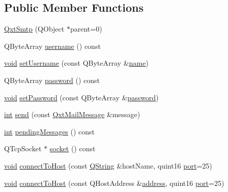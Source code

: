 \subsection*{Public Member Functions}
\begin{DoxyCompactItemize}
\item 
\hyperlink{class_qxt_smtp_a47e3f8f15544208303c1b2a85c2df804}{Qxt\-Smtp} (Q\-Object $\ast$parent=0)
\item 
Q\-Byte\-Array \hyperlink{class_qxt_smtp_a5bdb0b983376b48dd1b6f6b541e87fe0}{username} () const 
\item 
\hyperlink{group___u_a_v_objects_plugin_ga444cf2ff3f0ecbe028adce838d373f5c}{void} \hyperlink{class_qxt_smtp_a428fd874c14315d794d5f7dd4f01a530}{set\-Username} (const Q\-Byte\-Array \&\hyperlink{glext_8h_ad977737dfc9a274a62741b9500c49a32}{name})
\item 
Q\-Byte\-Array \hyperlink{class_qxt_smtp_ad3a18e0a50535ba863aab1fa330ec007}{password} () const 
\item 
\hyperlink{group___u_a_v_objects_plugin_ga444cf2ff3f0ecbe028adce838d373f5c}{void} \hyperlink{class_qxt_smtp_affd5ca3c638f285e64cae9247de7eb21}{set\-Password} (const Q\-Byte\-Array \&\hyperlink{class_qxt_smtp_ad3a18e0a50535ba863aab1fa330ec007}{password})
\item 
\hyperlink{ioapi_8h_a787fa3cf048117ba7123753c1e74fcd6}{int} \hyperlink{class_qxt_smtp_abc5b5bef64c1a2c5e25ab58490be8125}{send} (const \hyperlink{class_qxt_mail_message}{Qxt\-Mail\-Message} \&message)
\item 
\hyperlink{ioapi_8h_a787fa3cf048117ba7123753c1e74fcd6}{int} \hyperlink{class_qxt_smtp_ae280dd88b58bd9e862ee4b434c4516cf}{pending\-Messages} () const 
\item 
Q\-Tcp\-Socket $\ast$ \hyperlink{class_qxt_smtp_a5a216d8228ac6c7aa7d32e17dc88bf4e}{socket} () const 
\item 
\hyperlink{group___u_a_v_objects_plugin_ga444cf2ff3f0ecbe028adce838d373f5c}{void} \hyperlink{class_qxt_smtp_a833774a7f6539f8a21fed98c02598306}{connect\-To\-Host} (const \hyperlink{group___u_a_v_objects_plugin_gab9d252f49c333c94a72f97ce3105a32d}{Q\-String} \&host\-Name, quint16 \hyperlink{classport}{port}=25)
\item 
\hyperlink{group___u_a_v_objects_plugin_ga444cf2ff3f0ecbe028adce838d373f5c}{void} \hyperlink{class_qxt_smtp_afc26315ea74a434d245590953aae16d6}{connect\-To\-Host} (const Q\-Host\-Address \&\hyperlink{glext_8h_a86e3d190561a4ae1e195e1a2bcc83db5}{address}, quint16 \hyperlink{classport}{port}=25)
\item 

\end{DoxyCompactItemize}
